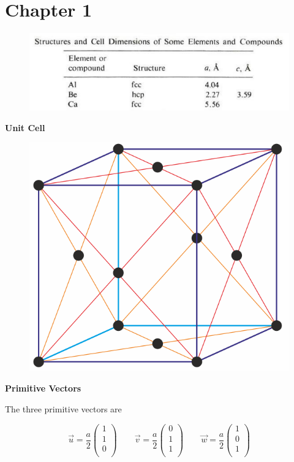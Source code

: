 \section{Chapter 1}

\begin{figure}[H]
	\centering
	\includegraphics[width=0.7\linewidth]{Graphics/Chapter1/StructuresAndCellDimension_Table1_2_Omar}
	\caption{}
	\label{}
\end{figure}


\textbf{Unit Cell}
\begin{figure}[H]
	\centering
	\includegraphics[width=0.4\linewidth]{Graphics/Chapter1/face-centered_cubic_lattice.png}
	\caption{}
	\label{}
\end{figure}

\textbf{Primitive Vectors}

The three primitive vectors are

$$\vec{u} = \frac{a}{2} \left(\begin{matrix}1\\1\\0\\\end{matrix}\right) \qquad
  \vec{v} = \frac{a}{2} \left(\begin{matrix}0\\1\\1\\\end{matrix}\right) \qquad
  \vec{w} = \frac{a}{2} \left(\begin{matrix}1\\0\\1\\\end{matrix}\right)$$

